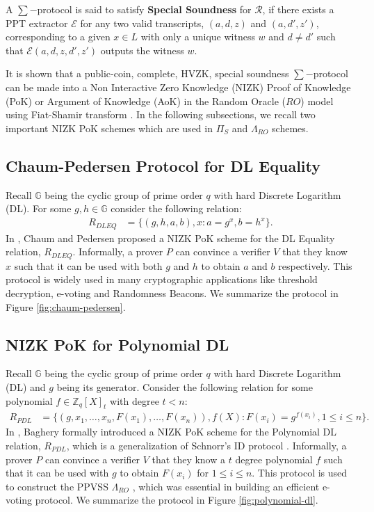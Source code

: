 \begin{definition}
  A $\sum-$protocol is said to satisfy \textbf{Special Soundness} for $\mathcal{R}$, 
  if there exists a PPT extractor $\mathcal{E}$ for any two valid transcripts, $(a,d,z)$ and 
  $(a,d',z')$, corresponding to a given $x\in L$ with only a unique witness $w$ and $d\neq d'$ such that $\mathcal{E}(a,d,z,d',z')$ outputs the 
  witness $w$. 
\end{definition}

It is shown that a public-coin, complete, HVZK, special soundness $\sum-$protocol can be made into a
Non Interactive Zero Knowledge (NIZK) Proof of Knowledge (PoK) or Argument of Knowledge (AoK) in the 
Random Oracle ($RO$) model using Fiat-Shamir transform \cite{10.1007/3-540-47721-7_12}. 
In the following subsections, we recall two important NIZK PoK schemes which are used in $\Pi_S$ and 
$\Lambda_{RO}$ schemes.

\subsection{Chaum-Pedersen Protocol for DL Equality}
\label{subsec:chaum-pedersen}
Recall $\mathbb{G}$ being the cyclic group of prime order $q$ with hard Discrete Logarithm (DL). 
For some $g,h\in \mathbb{G}$ consider the following relation:
\begin{align*}
  R_{DLEQ} &= \{(g,h,a,b),x : a=g^x, b=h^x\}.
\end{align*}
In \cite{10.1007/3-540-48071-4_7}, Chaum and Pedersen proposed a NIZK PoK scheme for the DL Equality 
relation, $R_{DLEQ}$. Informally, a prover $P$ can convince a verifier $V$ that they know $x$ such that
it can be used with both $g$ and $h$ to obtain $a$ and $b$ respectively. This protocol is widely used in
many cryptographic applications like threshold decryption, e-voting and Randomness Beacons. 
We summarize the protocol in Figure \ref{fig:chaum-pedersen}.


\subsection{NIZK PoK for Polynomial DL}
\label{subsec:polynomial-dl}
Recall $\mathbb{G}$ being the cyclic group of prime order $q$ with hard Discrete Logarithm (DL) and $g$ 
being its generator. Consider the following relation for some polynomial $f\in\mathbb{Z}_q[X]_t$ with
degree $t<n$:
\begin{align*}
  R_{PDL} &= \{(g,x_1,\dots,x_n,F(x_1),\dots,F(x_n)),f(X) : F(x_i)=g^{f(x_i)}, 1\leq i\leq n\}.
\end{align*}
In \cite{cryptoeprint:2023/1669}, Baghery formally introduced a NIZK PoK scheme for the Polynomial DL 
relation, $R_{PDL}$, which is a generalization of Schnorr's ID protocol \cite{crypto-1989-1727}. Informally, 
a prover $P$ can convince a verifier $V$ that they know a $t$ degree polynomial $f$ such that 
it can be used with $g$ to obtain $F(x_i)$ for $1\leq i\leq n$. This protocol is used to construct the PPVSS 
$\Lambda_{RO}$ \cite{cryptoeprint:2025/576}, which was essential in building an efficient e-voting protocol. 
We summarize the protocol in Figure \ref{fig:polynomial-dl}.


